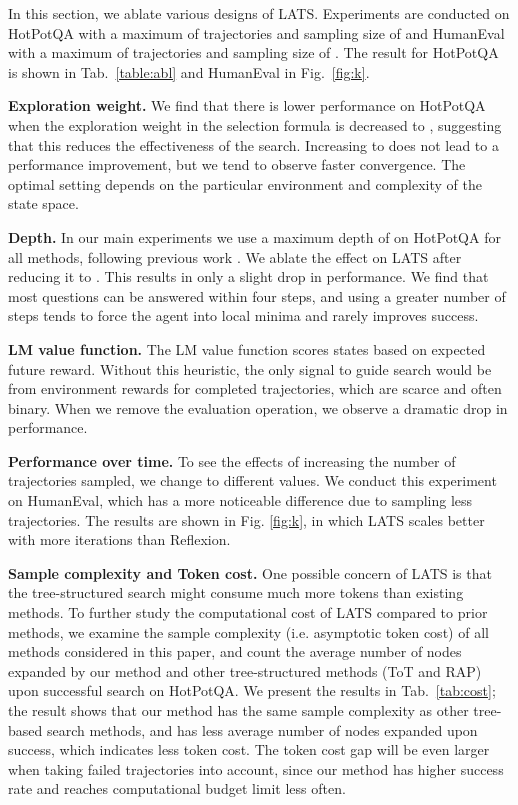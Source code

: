 \documentclass{article} \usepackage{iclr2024_conference,times}
\begin{document}
{In this section, we ablate various designs of LATS. Experiments are conducted on HotPotQA with a maximum of  trajectories and sampling size of  and HumanEval with a maximum of  trajectories and sampling size of . The result for HotPotQA is shown in Tab.~\ref{table:abl} and HumanEval in Fig.~\ref{fig:k}.

\textbf{Exploration weight.} We find that there is lower performance on HotPotQA when the exploration weight  in the selection formula is decreased to , suggesting that this reduces the effectiveness of the search. Increasing  to  does not lead to a performance improvement, but we tend to observe faster convergence. The optimal setting depends on the particular environment and complexity of the state space.

\textbf{Depth.} In our main experiments we use a maximum depth of  on HotPotQA for all methods, following previous work \citep{yao2023react}. We ablate the effect on LATS after reducing it to . This results in only a slight drop in performance. We find that most questions can be answered within four steps, and using a greater number of steps tends to force the agent into local minima and rarely improves success.

\textbf{LM value function.} The LM value function scores states based on expected future reward. Without this heuristic, the only signal to guide search would be from environment rewards for completed trajectories, which are scarce and often binary. When we remove the evaluation operation, we observe a dramatic  drop in performance.

\textbf{Performance over time.} To see the effects of increasing the number of trajectories sampled, we change  to different values. We conduct this experiment on HumanEval, which has a more noticeable difference due to sampling less trajectories. The results are shown in Fig. \ref{fig:k}, in which LATS scales better with more iterations than Reflexion.

\textbf{Sample complexity and Token cost.} One possible concern of LATS is that the tree-structured search might consume much more tokens than existing methods. To further study the computational cost of LATS compared to prior methods, we examine the sample complexity (i.e. asymptotic token cost) of all methods considered in this paper, and count the average number of nodes expanded by our method and other tree-structured methods (ToT and RAP) upon successful search on HotPotQA. We present the results in Tab.~\ref{tab:cost}; the result shows that our method has the same sample complexity as other tree-based search methods, and has less average number of nodes expanded upon success, which indicates less token cost. The token cost gap will be even larger when taking failed trajectories into account, since our method has higher success rate and reaches computational budget limit less often.

}
\end{document}
